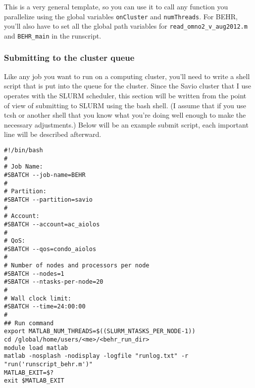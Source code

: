 \documentclass[12pt]{article}
\begin{document}
		This is a very general template, so you can use it to call any function you parallelize using the global variables \texttt{onCluster} and \texttt{numThreads}.  For BEHR, you'll also have to set all the global path variables for \texttt{read\_omno2\_v\_aug2012.m} and \texttt{BEHR\_main} in the runscript.
		
	\subsubsection{Submitting to the cluster queue} \label{sec:ClusterQueueMatlab}
		Like any job you want to run on a computing cluster, you'll need to write a shell script that is put into the queue for the cluster.  Since the Savio cluster that I use operates with the SLURM scheduler, this section will be written from the point of view of submitting to SLURM using the bash shell. (I assume that if you use tcsh or another shell that you know what you're doing well enough to make the necessary adjustments.) Below will be an example submit script, each important line will be described afterward.

\lstset{numbers=left,basicstyle=\scriptsize\ttfamily}
\begin{lstlisting}
#!/bin/bash
#
# Job Name:
#SBATCH --job-name=BEHR
#
# Partition:
#SBATCH --partition=savio
#
# Account:
#SBATCH --account=ac_aiolos
# 
# QoS:
#SBATCH --qos=condo_aiolos
#
# Number of nodes and processors per node
#SBATCH --nodes=1
#SBATCH --ntasks-per-node=20
#
# Wall clock limit:
#SBATCH --time=24:00:00
#
## Run command
export MATLAB_NUM_THREADS=$((SLURM_NTASKS_PER_NODE-1))
cd /global/home/users/<me>/<behr_run_dir>
module load matlab
matlab -nosplash -nodisplay -logfile "runlog.txt" -r "run('runscript_behr.m')"
MATLAB_EXIT=$?
exit $MATLAB_EXIT
\end{lstlisting}
\lstset{numbers=none,basicstyle=\ttfamily}
\end{document}
